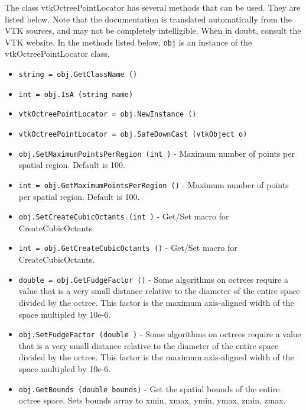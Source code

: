 The class vtkOctreePointLocator has several methods that can be used.
  They are listed below.
Note that the documentation is translated automatically from the VTK sources,
and may not be completely intelligible.  When in doubt, consult the VTK website.
In the methods listed below, \verb|obj| is an instance of the vtkOctreePointLocator class.
\begin{itemize}
\item  \verb|string = obj.GetClassName ()|

\item  \verb|int = obj.IsA (string name)|

\item  \verb|vtkOctreePointLocator = obj.NewInstance ()|

\item  \verb|vtkOctreePointLocator = obj.SafeDownCast (vtkObject o)|

\item  \verb|obj.SetMaximumPointsPerRegion (int )| -  Maximum number of points per spatial region.  Default is 100.

\item  \verb|int = obj.GetMaximumPointsPerRegion ()| -  Maximum number of points per spatial region.  Default is 100.

\item  \verb|obj.SetCreateCubicOctants (int )| -  Get/Set macro for CreateCubicOctants.

\item  \verb|int = obj.GetCreateCubicOctants ()| -  Get/Set macro for CreateCubicOctants.

\item  \verb|double = obj.GetFudgeFactor ()| -   Some algorithms on octrees require a value that is a very
  small distance relative to the diameter of the entire space
  divided by the octree.  This factor is the maximum axis-aligned
  width of the space multipled by 10e-6.

\item  \verb|obj.SetFudgeFactor (double )| -   Some algorithms on octrees require a value that is a very
  small distance relative to the diameter of the entire space
  divided by the octree.  This factor is the maximum axis-aligned
  width of the space multipled by 10e-6.

\item  \verb|obj.GetBounds (double bounds)| -    Get the spatial bounds of the entire octree space. Sets
    bounds array to xmin, xmax, ymin, ymax, zmin, zmax.


\end{itemize}
